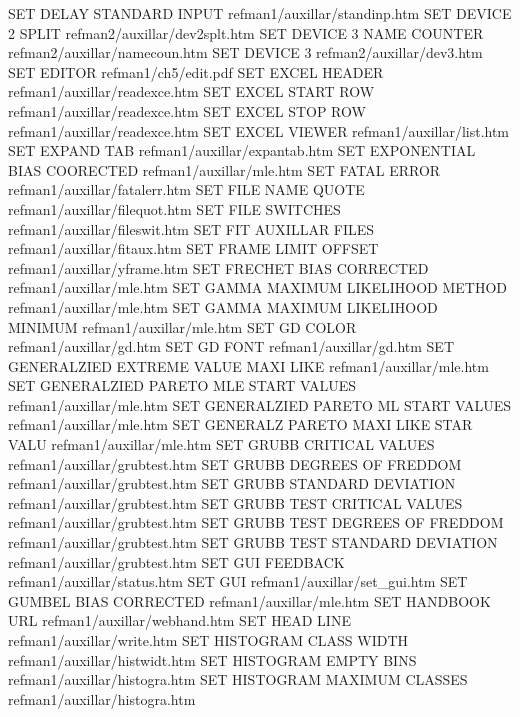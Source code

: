 SET DELAY STANDARD INPUT                refman1/auxillar/standinp.htm
SET DEVICE 2 SPLIT                      refman2/auxillar/dev2splt.htm
SET DEVICE 3 NAME COUNTER               refman2/auxillar/namecoun.htm
SET DEVICE 3                            refman2/auxillar/dev3.htm
SET EDITOR                              refman1/ch5/edit.pdf
SET EXCEL HEADER                        refman1/auxillar/readexce.htm
SET EXCEL START ROW                     refman1/auxillar/readexce.htm
SET EXCEL STOP ROW                      refman1/auxillar/readexce.htm
SET EXCEL VIEWER                        refman1/auxillar/list.htm
SET EXPAND TAB                          refman1/auxillar/expantab.htm
SET EXPONENTIAL BIAS COORECTED          refman1/auxillar/mle.htm
SET FATAL ERROR                         refman1/auxillar/fatalerr.htm
SET FILE NAME QUOTE                     refman1/auxillar/filequot.htm
SET FILE SWITCHES                       refman1/auxillar/fileswit.htm
SET FIT AUXILLAR FILES                  refman1/auxillar/fitaux.htm
SET FRAME LIMIT OFFSET                  refman1/auxillar/yframe.htm
SET FRECHET BIAS CORRECTED              refman1/auxillar/mle.htm
SET GAMMA MAXIMUM LIKELIHOOD METHOD     refman1/auxillar/mle.htm
SET GAMMA MAXIMUM LIKELIHOOD MINIMUM    refman1/auxillar/mle.htm
SET GD COLOR                            refman1/auxillar/gd.htm
SET GD FONT                             refman1/auxillar/gd.htm
SET GENERALZIED EXTREME VALUE MAXI LIKE refman1/auxillar/mle.htm
SET GENERALZIED PARETO MLE START VALUES refman1/auxillar/mle.htm
SET GENERALZIED PARETO ML START VALUES  refman1/auxillar/mle.htm
SET GENERALZ PARETO MAXI LIKE STAR VALU refman1/auxillar/mle.htm
SET GRUBB CRITICAL VALUES               refman1/auxillar/grubtest.htm
SET GRUBB DEGREES OF FREDDOM            refman1/auxillar/grubtest.htm
SET GRUBB STANDARD DEVIATION            refman1/auxillar/grubtest.htm
SET GRUBB TEST CRITICAL VALUES          refman1/auxillar/grubtest.htm
SET GRUBB TEST DEGREES OF FREDDOM       refman1/auxillar/grubtest.htm
SET GRUBB TEST STANDARD DEVIATION       refman1/auxillar/grubtest.htm
SET GUI FEEDBACK                        refman1/auxillar/status.htm
SET GUI                                 refman1/auxillar/set_gui.htm
SET GUMBEL BIAS CORRECTED               refman1/auxillar/mle.htm
SET HANDBOOK URL                        refman1/auxillar/webhand.htm
SET HEAD LINE                           refman1/auxillar/write.htm
SET HISTOGRAM CLASS WIDTH               refman1/auxillar/histwidt.htm
SET HISTOGRAM EMPTY BINS                refman1/auxillar/histogra.htm
SET HISTOGRAM MAXIMUM CLASSES           refman1/auxillar/histogra.htm
